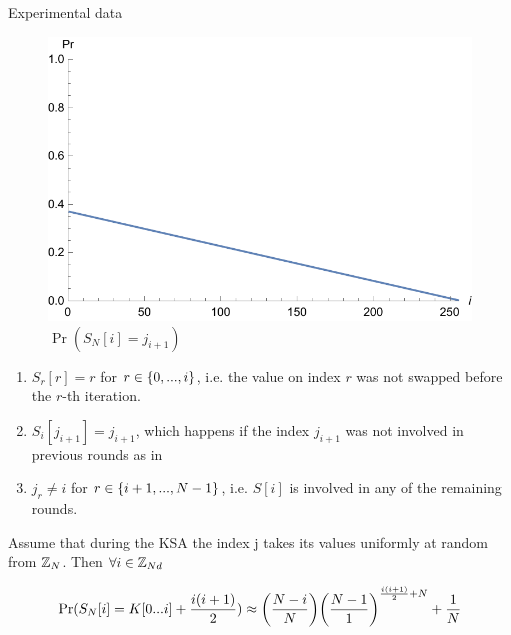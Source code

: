 Experimental data 

	\begin{figure}
		\centering
		\includegraphics[width=0.7\linewidth]{img/lemma2}
		\caption{$ \Pr(S_{N}[i] = j_{i+1})  $}
		\label{fig:lemma2}
	\end{figure}


	\begin{enumerate}
		\item $ S_{r}[r] = r $ for $ r \in \{0, ... , i\} $, i.e. the value on index $ r $ was not swapped before the $ r $-th iteration. 
		\item $ S_{i}[j_{i+1}]  = j_{i+1}$, which happens if the index $ j_{i+1} $ was not involved in previous rounds as in 
		\item $ j_{r} \neq i $ for $ r \in \{i+1, ... , N-1\}$, i.e. $ S[i] $ is involved in any of the remaining rounds. 
	\end{enumerate} 

	\begin{thm}{\cite{GoMa}}
		Assume that during the KSA the index j takes its values uniformly at random from $ \mathbb{Z}_{N} $. Then
		$ \forall i \in \mathbb{Z}_{Nd} $
		
		 \begin{equation}\label{theorem1}
		 \Pr(S_{N}[i] = K[{0}...{i}] + \dfrac{i(i+1)}{2})   \approx \bigg(\dfrac{N - i}{N}\bigg)\bigg(\dfrac{N-1}{1}\bigg)^{\frac{i(i+1)}{2}+N}+\dfrac{1}{N} 
		 \end{equation}
	\end{thm}

